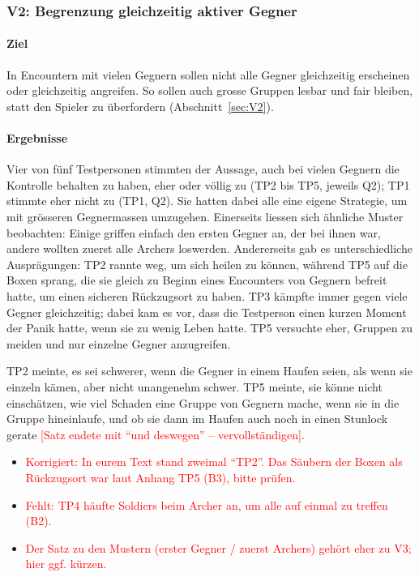 \documentclass[../Main.tex]{subfiles}
\begin{document}
\subsubsection{V2: Begrenzung gleichzeitig aktiver Gegner}

\paragraph{Ziel}
In Encountern mit vielen Gegnern sollen nicht alle Gegner gleichzeitig erscheinen oder gleichzeitig angreifen. So sollen auch grosse Gruppen lesbar und fair bleiben, statt den Spieler zu überfordern (Abschnitt~\ref{sec:V2}).

\paragraph{Ergebnisse}
Vier von fünf Testpersonen stimmten der Aussage, auch bei vielen Gegnern die Kontrolle behalten zu haben, eher oder völlig zu (TP2 bis TP5, jeweils Q2); TP1 stimmte eher nicht zu (TP1, Q2). Sie hatten dabei alle eine eigene Strategie, um mit grösseren Gegnermassen umzugehen. Einerseits liessen sich ähnliche Muster beobachten: Einige griffen einfach den ersten Gegner an, der bei ihnen war, andere wollten zuerst alle Archers loswerden. Andererseits gab es unterschiedliche Ausprägungen: TP2 rannte weg, um sich heilen zu können, während TP5 auf die Boxen sprang, die sie gleich zu Beginn eines Encounters von Gegnern befreit hatte, um einen sicheren Rückzugsort zu haben. TP3 kämpfte immer gegen viele Gegner gleichzeitig; dabei kam es vor, dass die Testperson einen kurzen Moment der Panik hatte, wenn sie zu wenig Leben hatte. TP5 versuchte eher, Gruppen zu meiden und nur einzelne Gegner anzugreifen.

TP2 meinte, es sei schwerer, wenn die Gegner in einem Haufen seien, als wenn sie einzeln kämen, aber nicht unangenehm schwer. TP5 meinte, sie könne nicht einschätzen, wie viel Schaden eine Gruppe von Gegnern mache, wenn sie in die Gruppe hineinlaufe, und ob sie dann im Haufen auch noch in einen Stunlock gerate \textcolor{red}{[Satz endete mit \enquote{und deswegen} -- vervollständigen]}.

\begin{itemize}[leftmargin=1.5cm]
    \item \textcolor{red}{Korrigiert: In eurem Text stand zweimal \enquote{TP2}. Das Säubern der Boxen als Rückzugsort war laut Anhang TP5 (B3), bitte prüfen.}
    \item \textcolor{red}{Fehlt: TP4 häufte Soldiers beim Archer an, um alle auf einmal zu treffen (B2).}
    \item \textcolor{red}{Der Satz zu den Mustern (erster Gegner / zuerst Archers) gehört eher zu V3; hier ggf. kürzen.}
\end{itemize}
\end{document}
